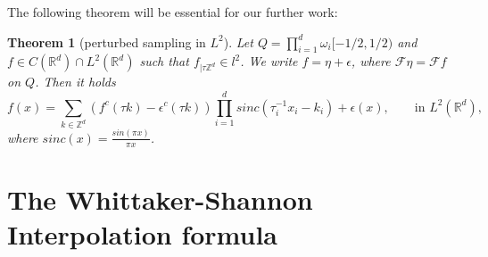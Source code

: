 \documentclass[a4paper, 11pt]{scrreprt}
\newtheorem{theorem}[defi]{Theorem}
\newcommand{\RR}{\mathbb{R}}
\newcommand{\ZZ}{\mathbb{Z}}
\newcommand{\FF}{\mathcal{F}}
\begin{document}
The following theorem will be essential for our further work:
\begin{theorem}[perturbed sampling in \(L^2\)]
\label{th:perturbed sampling}
Let \(Q = \prod_{i=1}^d \omega_i[-1/2, 1/2)\) and \\
 \({f\in C(\RR^d)\cap L^2(\RR^d)}\) such that \(f_{|\tau\ZZ^d} \in l^2\). We write \(f=\eta + \epsilon\), where \(\FF\eta = \FF f\) on \(Q\). Then it holds
\begin{equation}
	f(x) = \sum_{k\in\ZZ^d} (f^c(\tau k)-\epsilon^c(\tau k))\prod _{i=1}^d sinc(\tau_i^{-1}x_i-k_i)+\epsilon(x), \qquad \text{in } L^2(\RR^d),
\end{equation}
where \(sinc(x) = \frac{sin(\pi x)}{\pi x}\).
\end{theorem}

\section{The Whittaker-Shannon Interpolation formula}
\end{document}
